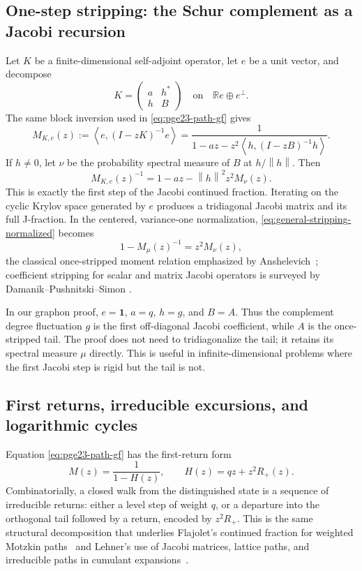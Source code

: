 ﻿\documentclass[11pt]{article}
\numberwithin{equation}{section}
\newcommand{\one}{\mathbf 1}
\newcommand{\R}{\mathbb R}
\newcommand{\ip}[2]{\left\langle #1,#2\right\rangle}
\newcommand{\norm}[1]{\left\lVert #1\right\rVert}
\begin{document}
\subsection{One-step stripping: the Schur complement as a Jacobi recursion}

Let $K$ be a finite-dimensional self-adjoint operator, let $e$ be a unit vector, and decompose
\[
  K=\begin{pmatrix}a&h^*\\h&B\end{pmatrix}
  \quad\text{on}\quad \R e\oplus e^\perp.
\]
The same block inversion used in \eqref{eq:pge23-path-gf} gives
\begin{equation}\label{eq:general-stripping}
  M_{K,e}(z):=\ip e{(I-zK)^{-1}e}
  =\frac{1}{1-az-z^2\ip h{(I-zB)^{-1}h}}.
\end{equation}
If $h\ne0$, let $\nu$ be the probability spectral measure of $B$ at $h/\norm h$.
Then
\begin{equation}\label{eq:general-stripping-normalized}
  M_{K,e}(z)^{-1}
  =1-az-\norm h^2z^2M_\nu(z).
\end{equation}
This is exactly the first step of the Jacobi continued fraction.
Iterating on the cyclic Krylov space generated by $e$ produces a tridiagonal Jacobi matrix and its full J-fraction.
In the centered, variance-one normalization, \eqref{eq:general-stripping-normalized} becomes
\[
  1-M_\mu(z)^{-1}=z^2M_\nu(z),
\]
the classical once-stripped moment relation emphasized by Anshelevich~\cite{Anshelevich2009}; coefficient stripping for scalar and matrix Jacobi operators is surveyed by Damanik--Pushnitski--Simon \cite{DamanikPushnitskiSimon2008}.

In our graphon proof, $e=\one$, $a=q$, $h=g$, and $B=A$.
Thus the complement degree fluctuation $g$ is the first off-diagonal Jacobi coefficient, while $A$ is the once-stripped tail.
The proof does not need to tridiagonalize the tail; it retains its spectral measure $\mu$ directly.
This is useful in infinite-dimensional problems where the first Jacobi step is rigid but the tail is not.

\subsection{First returns, irreducible excursions, and logarithmic cycles}

Equation \eqref{eq:pge23-path-gf} has the first-return form
\[
  M(z)=\frac{1}{1-H(z)},
  \qquad H(z)=qz+z^2R_+(z).
\]
Combinatorially, a closed walk from the distinguished state is a sequence of irreducible returns: either a level step of weight $q$, or a departure into the orthogonal tail followed by a return, encoded by $z^2R_+$.
This is the same structural decomposition that underlies Flajolet's continued fraction for weighted Motzkin paths~\cite{Flajolet1980} and Lehner's use of Jacobi matrices, lattice paths, and irreducible paths in cumulant expansions~\cite{Lehner2003}.
\end{document}

